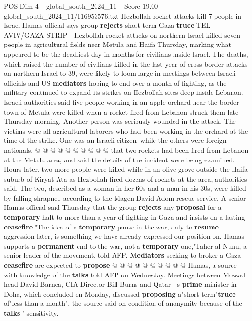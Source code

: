 \begin{textsample}{POS Dim 4 – global\_south\_2024\_11 – Score 19.00 – global\_south\_2024\_11/116953576.txt}  \label{ex:f4_pos_251}
Hezbollah rocket attacks kill 7 people in Israel Hamas official says group \textbf{rejects} short-term Gaza \textbf{truce} TEL AVIV/GAZA STRIP - Hezbollah rocket attacks on northern Israel killed seven people in agricultural fields near Metula and Haifa Thursday, marking what appeared to be the deadliest day in months for civilians inside Israel.
The deaths, which raised the number of civilians killed in the last year of cross-border attacks on northern Israel to 39, were likely to loom large in meetings between Israeli officials and US \textbf{mediators} hoping to end over a month of fighting, as the military continued to expand its strikes on Hezbollah sites deep inside Lebanon.
Israeli authorities said five people working in an apple orchard near the border town of Metula were killed when a rocket fired from Lebanon struck them late Thursday morning.
Another person was seriously wounded in the attack.
The victims were all agricultural laborers who had been working in the orchard at the time of the strike.
One was an Israeli citizen, while the others were foreign nationals. @ @ @ @ @ @ @ @ @ @ that two rockets had been fired from Lebanon at the Metula area, and said the details of the incident were being examined.
Hours later, two more people were killed while in an olive grove outside the Haifa suburb of Kiryat Ata as Hezbollah fired dozens of rockets at the area, authorities said.
The two, described as a woman in her 60s and a man in his 30s, were killed by falling shrapnel, according to the Magen David Adom rescue service.
A senior Hamas official said Thursday that the group \textbf{rejects} any \textbf{proposal} for a \textbf{temporary} halt to more than a year of fighting in Gaza and insists on a lasting \textbf{ceasefire}."The idea of a \textbf{temporary} pause in the war, only to \textbf{resume} aggression later, is something we have already expressed our position on.
Hamas supports a \textbf{permanent} end to the war, not a \textbf{temporary} one,"Taher al-Nunu, a senior leader of the movement, told AFP. \textbf{Mediators} seeking to broker a Gaza \textbf{ceasefire} are expected to \textbf{propose} @ @ @ @ @ @ @ @ @ @ Hamas, a source with knowledge of the \textbf{talks} told AFP on Wednesday.
Meetings between Mossad head David Barnea, CIA Director Bill Burns and Qatar ' s \textbf{prime} minister in Doha, which concluded on Monday, discussed \textbf{proposing} a"short-term"\textbf{truce} of"less than a month", the source said on condition of anonymity because of the \textbf{talks} ' sensitivity.

\end{textsample}
